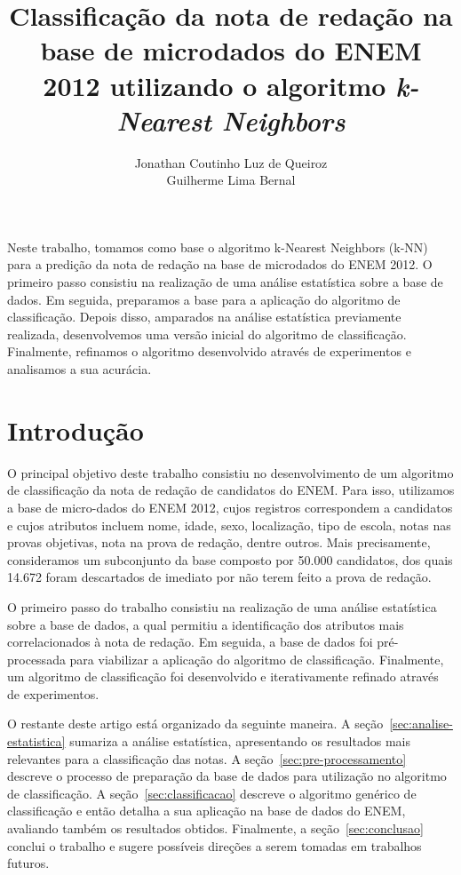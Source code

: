 \documentclass[12pt]{article}
\title{Classificação da nota de redação na base de microdados do ENEM 2012 utilizando o algoritmo \emph{k-Nearest Neighbors}}
\author{Jonathan Coutinho Luz de Queiroz\inst{1} \\ Guilherme Lima Bernal\inst{1}}
\begin{document}
 

\maketitle

\begin{resumo}
Neste trabalho, tomamos como base o algoritmo k-Nearest Neighbors (k-NN) para a predição da nota de redação na base de microdados do ENEM 2012.
O primeiro passo consistiu na realização de uma análise estatística sobre a base de dados.
Em seguida, preparamos a base para a aplicação do algoritmo de classificação.
Depois disso, amparados na análise estatística previamente realizada, desenvolvemos uma versão inicial do algoritmo de classificação.
Finalmente, refinamos o algoritmo desenvolvido através de experimentos e analisamos a sua acurácia.
\end{resumo}

\section{Introdução}
\label{sec:intro}
O principal objetivo deste trabalho consistiu no desenvolvimento de um algoritmo de classificação da nota de redação de candidatos do ENEM.
Para isso, utilizamos a base de micro-dados do ENEM 2012, cujos registros correspondem a candidatos e cujos atributos incluem nome, idade, sexo, localização, tipo de escola, notas nas provas objetivas, nota na prova de redação, dentre outros.
Mais precisamente, consideramos um subconjunto da base composto por 50.000 candidatos, dos quais 14.672 foram descartados de imediato por não terem feito a prova de redação.

O primeiro passo do trabalho consistiu na realização de uma análise estatística sobre a base de dados, a qual permitiu a identificação dos atributos mais correlacionados à nota de redação.
Em seguida, a base de dados foi pré-processada para viabilizar a aplicação do algoritmo de classificação.
Finalmente, um algoritmo de classificação foi desenvolvido e iterativamente refinado através de experimentos.

O restante deste artigo está organizado da seguinte maneira.
A seção~\ref{sec:analise-estatistica} sumariza a análise estatística, apresentando os resultados mais relevantes para a classificação das notas.
A seção~\ref{sec:pre-processamento} descreve o processo de preparação da base de dados para utilização no algoritmo de classificação.
A seção~\ref{sec:classificacao} descreve o algoritmo genérico de classificação e então detalha a sua aplicação na base de dados do ENEM, avaliando também os resultados obtidos.
Finalmente, a seção~\ref{sec:conclusao} conclui o trabalho e sugere possíveis direções a serem tomadas em trabalhos futuros.
\end{document}
